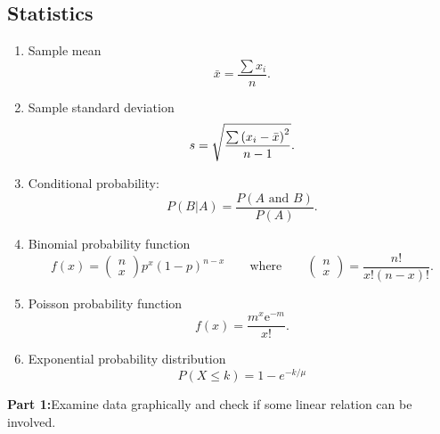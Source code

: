 \subsection{Statistics}

\begin{enumerate}
	\item Sample mean
	\begin{equation*}
	\bar{x}=\frac{\sum x_{i}}{n}.
	\end{equation*}
	
	\item Sample standard deviation
	\begin{equation*}
	s=\sqrt{\frac{\sum \left( x_{i}-\bar{x}\right) ^{2}}{%
			n-1}}.
	\end{equation*}
	
	\item Conditional probability:
	\begin{equation*}
	P(B|A)=\frac{P\left( A\text{ and }B\right) }{P\left( A\right) }.
	\end{equation*}
	
	\item Binomial probability function
	\begin{equation*}
	f\left( x\right) =\left(
	\begin{array}{c}
	n \\
	x%
	\end{array}%
	\right) p^{x}\left( 1-p\right) ^{n-x}\qquad \text{where}\qquad \left(
	\begin{array}{c}
	n \\
	x%
	\end{array}%
	\right) =\frac{n!}{x!\left( n-x\right) !}.
	\end{equation*}
	
	\item Poisson probability function
	\begin{equation*}
	f\left( x\right) =\frac{m^{x}\mathrm{e}^{-m}}{x!}.
	\end{equation*}
	
	\item Exponential probability distribution
	\begin{equation*}
	P\left( X \leq k \right) = 1 - e^{-k/\mu}
	\end{equation*}
	
	
\end{enumerate}



\noindent\textbf{Part 1:}Examine data graphically and check if some linear relation can be involved.

